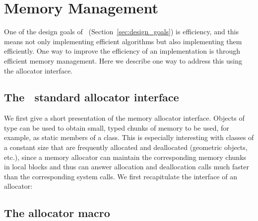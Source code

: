 
\chapter{Memory Management\label{chap:memory_management}}

One of the design goals of \cgal\ (Section~\ref{sec:design_goals}) is 
efficiency,
and this means not only implementing efficient algorithms
but also implementing them efficiently.  One way to improve the efficiency
of an implementation is through efficient memory management.  Here we
describe one way to address this using the allocator interface.

\section{The \CC\ standard allocator interface\label{sec:allocator_interface}}

We first give a short presentation of the memory allocator interface.
Objects of type  can be used to obtain small, typed 
chunks of memory to be used, for example, as static members of a class. 
This is especially
interesting with classes of a constant size that are frequently
allocated and deallocated (geometric objects, etc.), since a memory
allocator can maintain the corresponding memory chunks in local blocks
and thus can answer allocation and deallocation calls much faster than
the corresponding system calls. We first recapitulate the interface of
an allocator:



\section{The allocator macro\label{sec:allocator_macro}}

